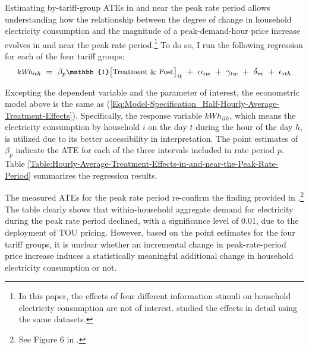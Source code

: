 Estimating by-tariff-group ATEs in and near the peak rate period allows understanding how the relationship between the degree of change in household electricity consumption and the magnitude of a peak-demand-hour price increase evolves in and near the peak rate period.\footnote{In this paper, the effects of four different information stimuli on household electricity consumption are not of interest. \cite{The-Effect-of-Information-on-TOU-Electricity-Use:An-Irish-Residential-Study_Pon_2017} studied the effects in detail using the same datasets.} To do so, I run the following regression for each of the four tariff groups:
\begin{equation}
\small
    \textit{kWh}_{ith} \ 
     = \ \beta_{p} \mathbb{1}\big[ \text{Treatment \& Post} \big]_{it} \ + \ \alpha_{iw} \ + \ \gamma_{tw} \ + \ \delta_{m} \ + \ \epsilon_{ith}
\label{Eq:Model-Specification_Hourly-Average-Treatment-Effects}
\end{equation}

Excepting the dependent variable and the parameter of interest, the econometric model above is the same as (\ref{Eq:Model-Specification_Half-Hourly-Average-Treatment-Effects}). Specifically, the response variable $kWh_{ith}$, which means the electricity consumption by household $i$ on the day $t$ during the hour of the day $h$, is utilized due to its better accessibility in interpretation. The point estimates of $\beta_{p}$ indicate the ATE for each of the three intervals included in rate period $p$. Table \ref{Table:Hourly-Average-Treatment-Effects-in-and-near-the-Peak-Rate-Period} summarizes the regression results.
\begin{landscape}
    
\end{landscape}

The measured ATEs for the peak rate period re-confirm the finding provided in \cite{Peaking-Interest:How-Awareness-Drives-the-Effectiveness-of-Time-of-Use-Electricity-Pricing_Prest_2020}.\footnote{See Figure 6 in \cite{Peaking-Interest:How-Awareness-Drives-the-Effectiveness-of-Time-of-Use-Electricity-Pricing_Prest_2020}.} The table clearly shows that within-household aggregate demand for electricity during the peak rate period declined, with a significance level of 0.01, due to the deployment of TOU pricing. However, based on the point estimates for the four tariff groups, it is unclear whether an incremental change in peak-rate-period price increase induces a statistically meaningful additional change in household electricity consumption or not. 

